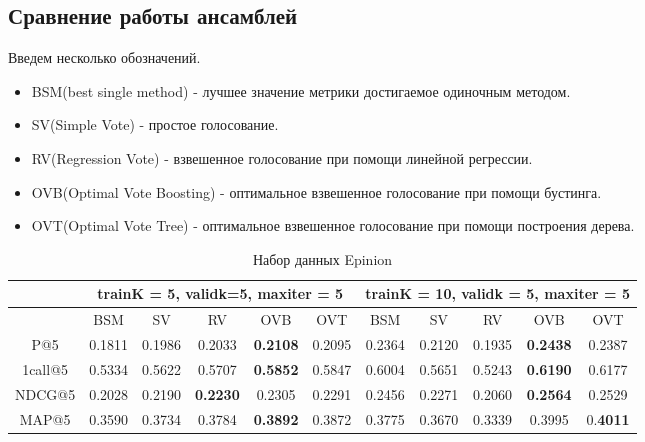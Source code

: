 \documentclass[a4paper,12pt]{article}
\begin{document}
\subsection*{Сравнение работы ансамблей}
Введем несколько обозначений.
\begin{itemize}
\item 
BSM(best single method) - лучшее значение метрики достигаемое одиночным методом.
\item 
SV(Simple Vote)  - простое голосование.
\item 
RV(Regression Vote) - взвешенное голосование при помощи линейной регрессии.
\item 
OVB(Optimal Vote Boosting) - оптимальное взвешенное голосование при помощи бустинга.
\item 
OVT(Optimal Vote Tree) - оптимальное взвешенное голосование при помощи построения дерева.
\end{itemize}




\begin{table}[H]
\caption{Набор данных Epinion}
\label{tab:movm}
\begin{tabular}{|c|c|c|c|c|c|c|c|c|c|c|}
\hline
& \multicolumn{5}{|c|}{trainK = 5, validk=5, maxiter = 5} & \multicolumn{5}{|c|}{trainK = 10, validk = 5, maxiter = 5}\\
\hline
  & BSM  & SV &  RV & OVB & OVT &BSM  & SV & RV & OVB & OVT \\
\hline
P@5 & 0.1811 & 0.1986 & 0.2033 & \textbf{0.2108} & 0.2095 & 0.2364 & 0.2120& 0.1935& \textbf{0.2438} & 0.2387 \\
\hline
1call@5 & 0.5334  & 0.5622 &0.5707 & \textbf{0.5852} & 0.5847 & 0.6004 & 0.5651&0.5243 & \textbf{0.6190}& 0.6177\\
\hline
NDCG@5 & 0.2028 & 0.2190 & \textbf{0.2230} & 0.2305 & 0.2291 & 0.2456&0.2271 & 0.2060 &\textbf{0.2564} & 0.2529\\
\hline
MAP@5 & 0.3590 & 0.3734 & 0.3784 & \textbf{0.3892}& 0.3872 & 0.3775& 0.3670& 0.3339 &0.3995 & 0.\textbf{4011}\\
\hline
\end{tabular}
\end{table} 
\end{document}
